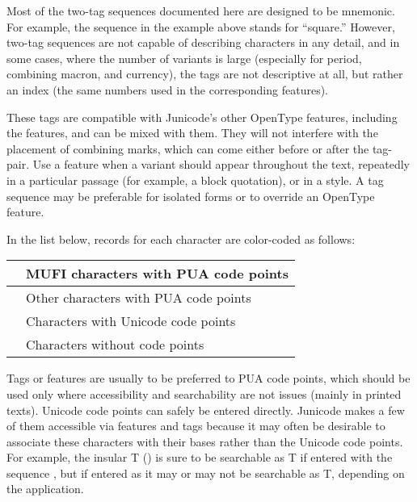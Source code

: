 Most of the two-tag sequences documented here are designed to be mnemonic. For example, the
 sequence in the example
above stands for ``square.'' However, two-tag sequences are not capable of describing characters in any detail, and in
some cases, where the number of variants is large (especially for period, combining macron, and currency), the tags are
not descriptive at all, but rather an index (the same numbers used in the corresponding {\charvar} features).

These tags are compatible with Junicode's other OpenType features, including the {\charvar} features, and can be mixed with
them. They will not interfere with the placement of combining marks, which can come either before or after the tag-pair. Use a {\charvar} feature when a variant should appear
throughout the text, repeatedly in a particular passage (for example, a block quotation), or in a style. A tag sequence may be preferable for isolated forms or to override an OpenType feature.

In the list below, records for each character are color-coded as follows:

\begin{center}
  \tablefirsthead{}
  \tablehead{}
  \tabletail{\hline}
  \tablelasttail{\hline}
  \begin{supertabular}{|m{13mm}|m{72mm}|}
    \hline
     & MUFI characters with PUA code points\\\hline
     & Other characters with PUA code points\\\hline
     & Characters with Unicode code points\\\hline
     & Characters without code points\\
  \end{supertabular}
\end{center}

\noindent Tags or {\charvar} features are usually to be preferred to PUA code points,
which should be used only where accessibility and searchability are
not issues (mainly in printed texts). Unicode code points can safely be
entered directly. Junicode makes a few of them accessible via {\charvar} features and tags because it may often
be desirable to associate these characters with their bases rather than the Unicode code points. For
example, the insular T () is sure to be searchable as T if entered with the sequence
, but if entered as  it may or may not be searchable as T,
depending on the application.

